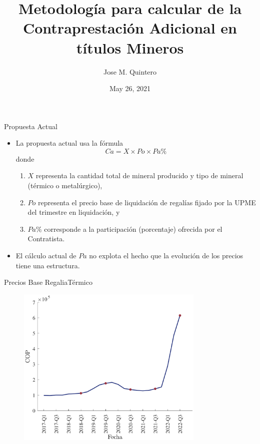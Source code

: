 \documentclass[usenames,dvipsnames]{beamer}
\title{Metodología para calcular de la Contraprestación Adicional en títulos Mineros }
\author{Jose M. Quintero}
\date{May 26, 2021}
\begin{document}
\begin{frame}
  \titlepage
\end{frame}

\begin{frame}{Propuesta Actual}
\begin{itemize}
    \item La propuesta actual usa la fórmula
    \begin{equation*}
        Ca = X\times Po\times Pa\%
    \end{equation*}
    donde 
    \begin{enumerate}
        \item $X$ representa la cantidad total de mineral producido y tipo de mineral (térmico o metalúrgico), 
        \item $Po$ representa el precio base de liquidación de regalías fijado por la UPME del trimestre en liquidación, y 
        \item $Pa\%$ corresponde a la participación (porcentaje) ofrecida por el Contratista. 
    \end{enumerate}
    \item El cálculo actual de $Pa$ no explota el hecho que la evolución de los precios tiene una estructura. 
\end{itemize}
\end{frame}

\begin{frame}{Precios Base Regalia}{Térmico}
    \begin{figure}
        \centering
        \includegraphics[width=0.8\textwidth]{Figures/Price_series.pdf}
    \end{figure}
\end{frame}
\end{document}
